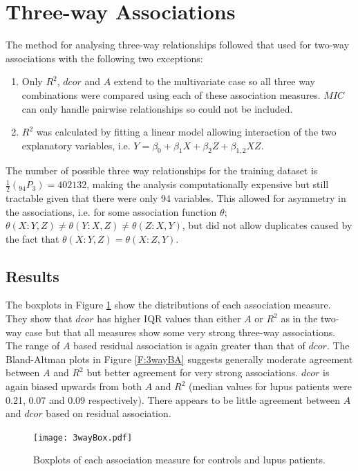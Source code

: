 \documentclass[a4paper, 12pt]{report}
\begin{document}
\section{Three-way Associations}
The method for analysing three-way relationships followed that used for two-way associations with the following two exceptions:

\begin{enumerate}
\item Only $R^2$, $dcor$ and $A$ extend to the multivariate case so all three way combinations were compared using each of these association measures. $MIC$ can only handle pairwise relationships so could not be included.
\item $R^2$ was calculated by fitting a linear model allowing interaction of the two explanatory variables, i.e. $Y= \beta_0 +\beta_1X+ \beta_2Z+ \beta_{1,2}X  Z$. 
\end{enumerate}

The number of possible three way relationships for the training dataset is $\frac{1}{2}(_{94} P_{3})=402132$, making the analysis computationally expensive but still tractable given that there were only 94 variables. This allowed for asymmetry in the associations, i.e. for some association function $\theta$; $\theta(X:Y,Z) \ne \theta(Y:X,Z) \ne \theta(Z:X,Y)$, but did not allow duplicates caused by the fact that $\theta(X:Y,Z) = \theta(X:Z,Y)$.

\subsection*{Results}
The boxplots in Figure \ref{F:3wayBox} show the distributions of each association measure. They show that $dcor$ has higher IQR values than either $A$ or $R^2$ as in the two-way case but that all measures show some very strong three-way associations. The range of $A$ based residual association is again greater than that of $dcor$. The Bland-Altman plots in Figure \ref{F:3wayBA} suggests generally moderate agreement between $A$ and $R^2$ but better agreement for very strong associations. $dcor$ is again biased upwards from both $A$ and $R^2$ (median values for lupus patients were 0.21, 0.07 and 0.09 respectively). There appears to be little agreement between $A$ and $dcor$ based on residual association. 

\begin{figure}[H]
\begin{centering}
\texttt{[image: 3wayBox.pdf]}
\caption{Boxplots of each association measure for controls and lupus patients.} 
\label{F:3wayBox}
\end{centering}
\end{figure}
\end{document}
